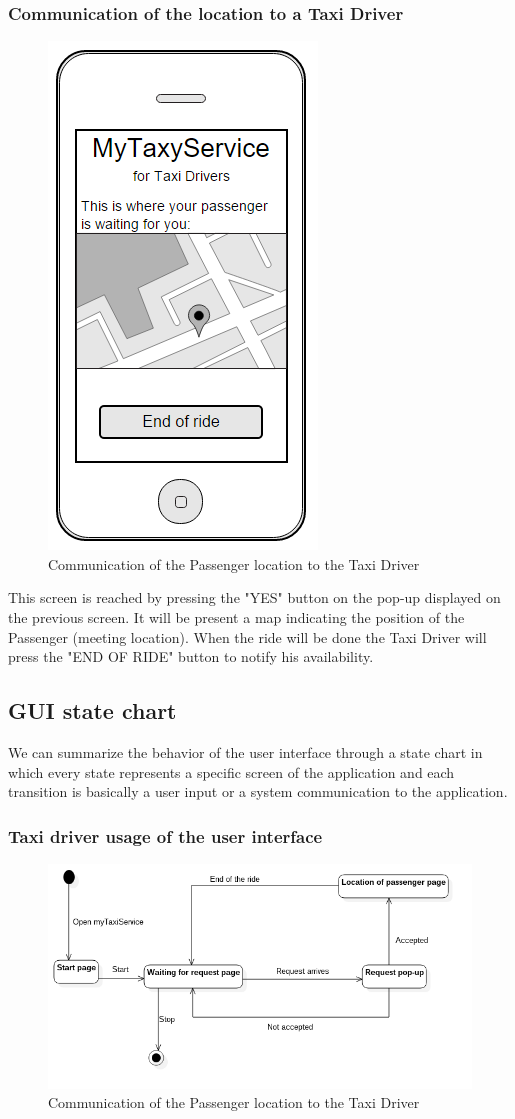 \subsubsection{Communication of the location to a Taxi Driver}
\begin{figure}[H]
\centering
\includegraphics[scale=0.6]{Images/taxi_driver_busy}
\caption{Communication of the Passenger location to the Taxi Driver}
\end{figure}
This screen is reached by pressing the "YES" button on the pop-up displayed on the previous screen. It will be present a map indicating the position of the Passenger (meeting location). When the ride will be done the Taxi Driver will press the "END OF RIDE" button to notify his availability.


\subsection{GUI state chart}
We can summarize the behavior of the user interface through a state chart in which every state represents a specific screen of the application and each transition is basically a user input or a system communication to the application.
\subsubsection{Taxi driver usage of the user interface}
\begin{figure}[H]
\centering
\includegraphics[scale=0.6]{Images/statechart_GUI}
\caption{Communication of the Passenger location to the Taxi Driver}
\end{figure}